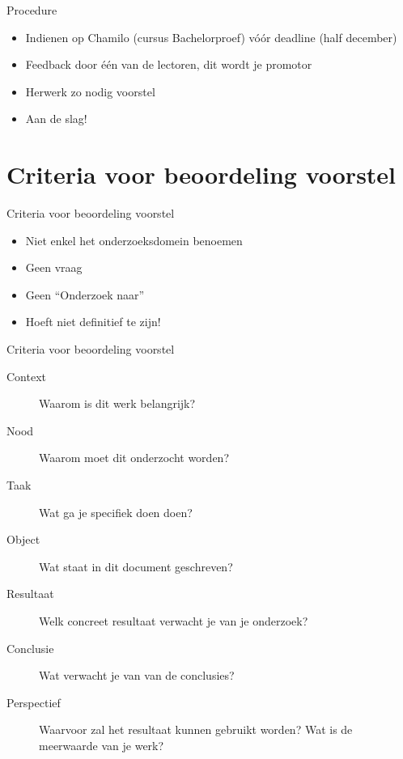\documentclass[aspectratio=169,usenames,dvipsnames]{beamer}
\begin{document}
\begin{frame}{Procedure}

\begin{itemize}
  \item Indienen op Chamilo (cursus Bachelorproef) vóór deadline (half december)
  \item Feedback door één van de lectoren, dit wordt je promotor
  \item Herwerk zo nodig voorstel
  \item Aan de slag!
\end{itemize}
\end{frame}

\section{Criteria voor beoordeling voorstel}

\begin{frame}{Criteria voor beoordeling voorstel}


\begin{itemize}
  \item Niet enkel het onderzoeksdomein benoemen
  \item Geen vraag
  \item Geen ``Onderzoek naar''
  \item Hoeft niet definitief te zijn!
\end{itemize}


%

\end{frame}

\begin{frame}{Criteria voor beoordeling voorstel}

\small
\begin{description}
  \item[Context] Waarom is dit werk belangrijk?
  \item[Nood] Waarom moet dit onderzocht worden?
  \item[Taak] Wat ga je specifiek doen doen?
  \item[Object] Wat staat in dit document geschreven?
  \item[Resultaat] Welk concreet resultaat verwacht je van je onderzoek?
  \item[Conclusie] Wat verwacht je van van de conclusies?
  \item[Perspectief] Waarvoor zal het resultaat kunnen gebruikt worden? Wat is de meerwaarde van je werk?
\end{description}


\end{frame}
\end{document}
